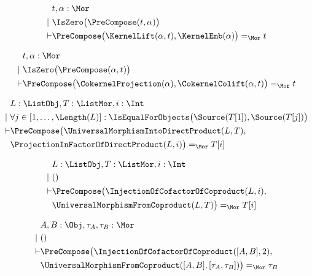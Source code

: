 \begin{sequent}
\begin{align*}
  &t, \alpha:\Mor\\
  |~ &\IsZero\big( \PreCompose( t, \alpha ) \big)\\
  \vdash &\PreCompose\big(\KernelLift( \alpha , t ), \KernelEmb( \alpha ) \big) =_{\Mor} t
\end{align*}
\end{sequent}

\begin{sequent}
\begin{align*}
  &t, \alpha:\Mor\\
  |~  &\IsZero\big(\PreCompose(\alpha, t)\big)\\
  \vdash &\PreCompose\big(\CokernelProjection( \alpha ), \CokernelColift( \alpha, t )\big) =_{\Mor} t
\end{align*}
\end{sequent}

\begin{sequent}
\begin{align*}
  &L:\ListObj, T:\ListMor, i:\Int\\
  | ~& \forall j \in [ 1, \dots, \Length( L ) ]: \IsEqualForObjects\big(\Source( T[1] ), \Source( T[j] ) \big) \\
  \vdash &\PreCompose\big(\UniversalMorphismIntoDirectProduct( L, T ), \\
  &\ProjectionInFactorOfDirectProduct( L, i ) \big) =_{\Mor} T[i]
\end{align*}
\end{sequent}

\begin{sequent}
\begin{align*}
  &L:\ListObj, T:\ListMor, i:\Int\\
  |~ &()\\
  \vdash &\PreCompose\big(\InjectionOfCofactorOfCoproduct( L, i ),\\
  &\UniversalMorphismFromCoproduct( L, T ) \big) =_{\Mor} T[i]
\end{align*}
\end{sequent}

\begin{sequent}
\begin{align*}
  &A, B:\Obj, \tau_A, \tau_B:\Mor \\
  |~ &()\\
  \vdash &\PreCompose\big(\InjectionOfCofactorOfCoproduct( [A, B], 2 ),\\
  &\UniversalMorphismFromCoproduct( [A,B], [\tau_A, \tau_B] ) \big) =_{\Mor} \tau_B 
\end{align*}
\end{sequent}


